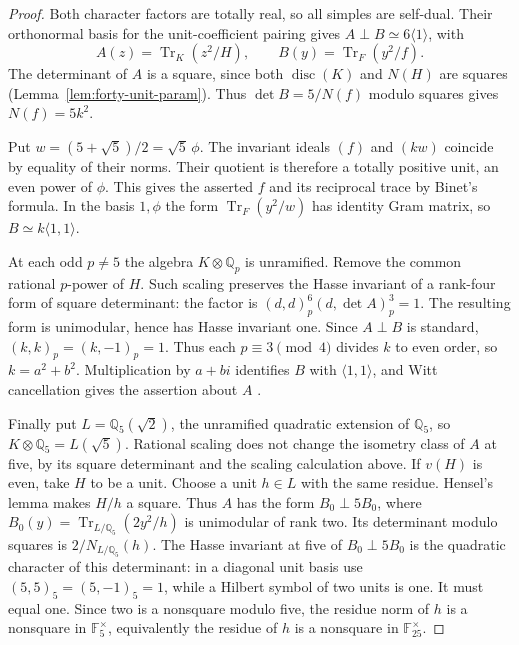 \documentclass[11pt,reqno]{amsart}
\theoremstyle{remark}\newtheorem{remark}[theorem]{Remark}
\numberwithin{equation}{section}
\begin{document}
\begin{proof}
Both character factors are totally real, so all simples are self-dual.
Their orthonormal basis for the unit-coefficient pairing gives
$A\perp B\simeq6\langle1\rangle$, with
\[
 A(z)=\operatorname{Tr}_K(z^2/H),\qquad B(y)=\operatorname{Tr}_F(y^2/f).
\]
The determinant of $A$ is a square, since both $\operatorname{disc}(K)$
and $N(H)$ are squares (Lemma~\ref{lem:forty-unit-param}). Thus
$\det B=5/N(f)$ modulo squares gives $N(f)=5k^2$.

Put $w=(5+\sqrt5)/2=\sqrt5\,\phi$. The invariant ideals $(f)$
and $(kw)$ coincide by equality of their norms. Their quotient is
therefore a totally positive unit, an even power of $\phi$.
This gives the asserted $f$ and its reciprocal trace by Binet's
formula. In the basis $1,\phi$ the form
$\operatorname{Tr}_F(y^2/w)$ has identity Gram matrix,
so $B\simeq k\langle1,1\rangle$.

At each odd $p\ne5$ the algebra $K\otimes\mathbb Q_p$ is unramified.
Remove the common rational $p$-power of $H$. Such scaling preserves
the Hasse invariant of a rank-four form of square determinant:
the factor is $(d,d)_p^6(d,\det A)_p^3=1$. The resulting form is
unimodular, hence has Hasse invariant one. Since $A\perp B$ is
standard, $(k,k)_p=(k,-1)_p=1$. Thus each $p\equiv3\pmod4$ divides
$k$ to even order, so $k=a^2+b^2$. Multiplication by $a+bi$
identifies $B$ with $\langle1,1\rangle$, and Witt cancellation gives
the assertion about $A$ \cite[Chapters~III--IV]{SerreArithmetic}.

Finally put $L=\mathbb Q_5(\sqrt2)$, the unramified quadratic extension
of $\mathbb Q_5$, so $K\otimes\mathbb Q_5=L(\sqrt5)$. Rational scaling
does not change the isometry class of $A$ at five, by its square
determinant and the scaling calculation above. If $v(H)$ is even, take
$H$ to be a unit. Choose a unit $h\in L$ with the same residue.
Hensel's lemma makes $H/h$ a square. Thus $A$ has the form $B_0\perp5B_0$,
where $B_0(y)=\operatorname{Tr}_{L/\mathbb Q_5}(2y^2/h)$ is unimodular
of rank two. Its determinant modulo squares is $2/N_{L/\mathbb Q_5}(h)$.
The Hasse invariant at five of $B_0\perp5B_0$ is the quadratic
character of this determinant: in a diagonal unit basis use
$(5,5)_5=(5,-1)_5=1$, while a Hilbert symbol of two units is one.
It must equal one. Since two is a nonsquare modulo five, the residue norm
of $h$ is a nonsquare in $\mathbb F_5^\times$, equivalently the residue
of $h$ is a nonsquare in $\mathbb F_{25}^\times$.
\end{proof}
\end{document}

